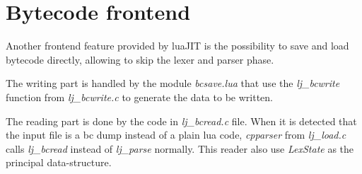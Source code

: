 
\section{Bytecode frontend}
\label{Sec:bc-frontend}

Another frontend feature provided by luaJIT is the possibility to save and load
bytecode directly, allowing to skip the lexer and parser phase.

The writing part is handled by the module \emph{bcsave.lua} that use the
\emph{lj\_bcwrite} function from \emph{lj\_bcwrite.c} to generate the data to be written.

The reading part is done by the code in \emph{lj\_bcread.c} file. When it is
detected that the input file is a bc dump instead of a plain lua code,
\emph{cpparser} from \emph{lj\_load.c} calls \emph{lj\_bcread} instead of
\emph{lj\_parse} normally. This reader also use \emph{LexState} as the principal
data-structure.

